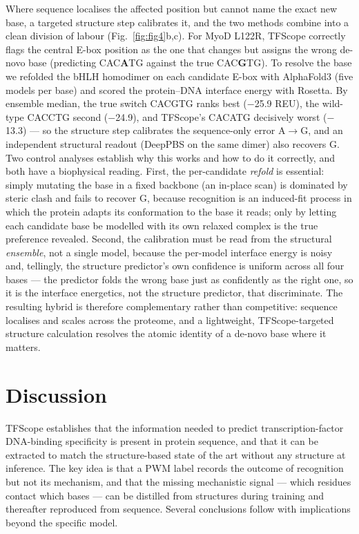 \documentclass[11pt,letterpaper]{article}
\begin{document}
Where sequence localises the affected position but cannot name the exact new base, a targeted
structure step calibrates it, and the two methods combine into a clean division of labour
(Fig.~\ref{fig:fig4}b,c). For MyoD L122R, TFScope correctly flags the central E-box position as
the one that changes but assigns the wrong de-novo base (predicting CAC\textbf{A}TG against the true
CAC\textbf{G}TG). To resolve the base we refolded the bHLH homodimer on each candidate E-box with
AlphaFold3 (five models per base) and scored the protein--DNA interface energy with Rosetta. By
ensemble median, the true switch CACGTG ranks best ($-$25.9 REU), the wild-type CACCTG second
($-$24.9), and TFScope's CACATG decisively worst ($-$13.3) --- so the structure step calibrates the
sequence-only error A$\to$G, and an independent structural readout (DeepPBS on the same dimer) also
recovers G. Two control analyses establish why this works and how to do it correctly, and both have
a biophysical reading. First, the per-candidate \emph{refold} is essential: simply mutating the
base in a fixed backbone (an in-place scan) is dominated by steric clash and fails to recover G,
because recognition is an induced-fit process in which the protein adapts its conformation to the
base it reads; only by letting each candidate base be modelled with its own relaxed complex is the
true preference revealed. Second, the calibration must be read from the structural \emph{ensemble},
not a single model, because the per-model interface energy is noisy and, tellingly, the structure
predictor's own confidence is uniform across all four bases --- the predictor folds the wrong base
just as confidently as the right one, so it is the interface energetics, not the structure
predictor, that discriminate. The resulting hybrid is therefore complementary rather than
competitive: sequence localises and scales across the proteome, and a lightweight,
TFScope-targeted structure calculation resolves the atomic identity of a de-novo base where it
matters.

\section*{Discussion}

TFScope establishes that the information needed to predict transcription-factor DNA-binding
specificity is present in protein sequence, and that it can be extracted to match the
structure-based state of the art without any structure at inference. The key idea is that a PWM
label records the outcome of recognition but not its mechanism, and that the missing mechanistic
signal --- which residues contact which bases --- can be distilled from structures during training
and thereafter reproduced from sequence. Several conclusions follow with implications beyond the
specific model.
\end{document}
